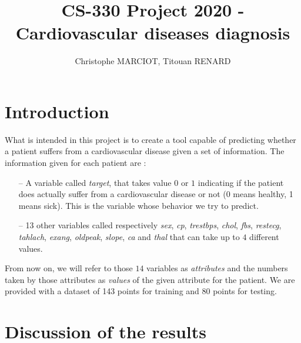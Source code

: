 \documentclass[9pt]{extarticle}
\title{CS-330 Project 2020 - Cardiovascular diseases diagnosis}   %
\author{Christophe MARCIOT, Titouan RENARD}         %
\begin{document}
\maketitle

\section{Introduction}
What is intended in this project is to create a tool capable of predicting whether a patient suffers from a cardiovascular disease given a set of information.
The information given for each patient are :
	\begin{itemize}[topsep=0pt,itemsep=0pt,partopsep=0pt, parsep=0pt]
		\item[--] A variable called \emph{target}, that takes value $0$ or $1$ indicating if the patient does actually suffer from a cardiovascular disease or not (0 means healthy, 1 means sick). This is the variable whose behavior we try to predict.
		\item[--] 13 other variables called respectively \emph{sex}, \emph{cp}, \emph{trestbps}, \emph{chol}, \emph{fbs}, \emph{restecg}, \emph{tahlach}, \emph {exang}, \emph{oldpeak}, \emph{slope}, \emph{ca} and \emph{thal} that can take up to $4$ different values.
	\end{itemize}
From now on, we will refer to those $14$  variables as \emph{attributes} and the numbers taken by those attributes as \emph{values} of the given attribute for the patient. We are provided with a dataset of 143 points for training and 80 points for testing.

\section{Discussion of the results}
\end{document}
